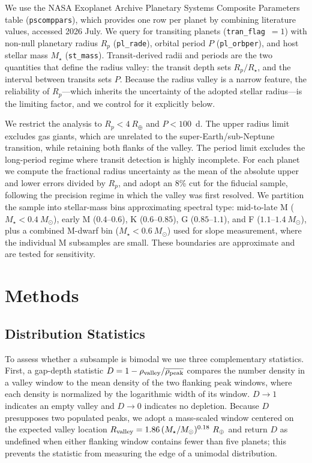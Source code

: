 \documentclass[twocolumn]{aastex701}
\newcommand{\rade}{R_\oplus}
\newcommand{\msun}{M_\odot}
\begin{document}
We use the NASA Exoplanet Archive Planetary Systems Composite Parameters
table (\texttt{pscomppars}), which provides one row per planet by combining
literature values, accessed 2026 July. We query for transiting planets
(\texttt{tran\_flag}~$=1$) with non-null planetary radius $R_p$
(\texttt{pl\_rade}), orbital period $P$ (\texttt{pl\_orbper}), and host
stellar mass $M_\star$ (\texttt{st\_mass}). Transit-derived radii and periods
are the two quantities that define the radius valley: the transit depth sets
$R_p/R_\star$, and the interval between transits sets $P$. Because the radius
valley is a narrow feature, the reliability of $R_p$---which inherits the
uncertainty of the adopted stellar radius---is the limiting factor, and we
control for it explicitly below.

We restrict the analysis to $R_p < 4~\rade$ and $P < 100$~d. The upper radius
limit excludes gas giants, which are unrelated to the super-Earth/sub-Neptune
transition, while retaining both flanks of the valley. The period limit
excludes the long-period regime where transit detection is highly incomplete.
For each planet we compute the fractional radius uncertainty as the mean of the
absolute upper and lower errors divided by $R_p$, and adopt an 8\% cut for the
fiducial sample, following the precision regime in which the valley was first
resolved. We partition the sample into stellar-mass bins approximating spectral
type: mid-to-late M ($M_\star < 0.4~\msun$), early M ($0.4$--$0.6$),
K ($0.6$--$0.85$), G ($0.85$--$1.1$), and F ($1.1$--$1.4~\msun$), plus a
combined M-dwarf bin ($M_\star < 0.6~\msun$) used for slope measurement, where
the individual M subsamples are small. These boundaries are approximate and are
tested for sensitivity.

\section{Methods} \label{sec:methods}

\subsection{Distribution Statistics}
\label{sec:methods_dist}

To assess whether a subsample is bimodal we use three complementary
statistics. First, a gap-depth statistic $D = 1 - \rho_{\rm valley} /
\overline{\rho_{\rm peak}}$ compares the number density in a valley window to
the mean density of the two flanking peak windows, where each density is
normalized by the logarithmic width of its window. $D \to 1$ indicates an empty
valley and $D \to 0$ indicates no depletion. Because $D$ presupposes two
populated peaks, we adopt a mass-scaled window centered on the expected valley
location $R_{\rm valley} = 1.86\,(M_\star/\msun)^{0.18}~\rade$
\citep{Petigura2022} and return $D$ as undefined when either flanking window
contains fewer than five planets; this prevents the statistic from measuring
the edge of a unimodal distribution.
\end{document}
